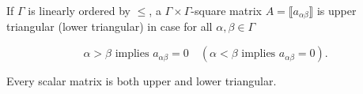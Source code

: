 If $\Gamma$ is linearly ordered by $\leq$, a $\Gamma \times \Gamma$-square matrix $A = \llbracket a_{\alpha\beta} \rrbracket$ is upper triangular (lower triangular) in case for all $\alpha, \beta \in \Gamma$

$$\alpha > \beta \text{ implies } a_{\alpha\beta} = 0 \quad (\alpha < \beta \text{ implies } a_{\alpha\beta} = 0).$$

Every scalar matrix is both upper and lower triangular.
